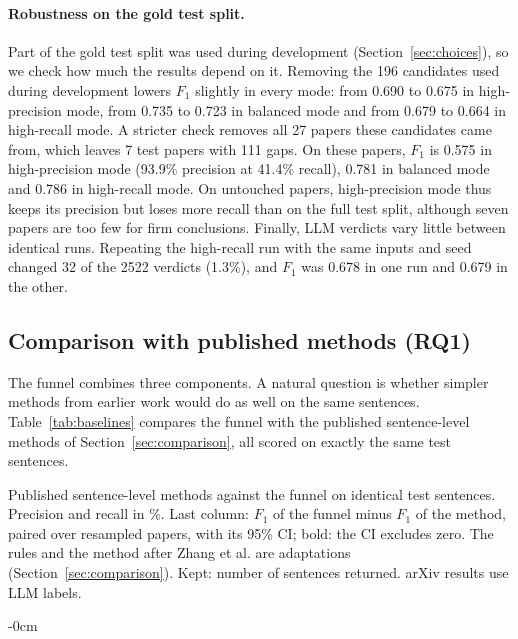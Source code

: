 \paragraph{Robustness on the gold test split.} Part of the gold test split was used during development (Section~\ref{sec:choices}), so we check how much the results depend on it. Removing the 196 candidates used during development lowers $F_1$ slightly in every mode: from 0.690 to 0.675 in high-precision mode, from 0.735 to 0.723 in balanced mode and from 0.679 to 0.664 in high-recall mode. A stricter check removes all 27 papers these candidates came from, which leaves 7 test papers with 111 gaps. On these papers, $F_1$ is 0.575 in high-precision mode (93.9\% precision at 41.4\% recall), 0.781 in balanced mode and 0.786 in high-recall mode. On untouched papers, high-precision mode thus keeps its precision but loses more recall than on the full test split, although seven papers are too few for firm conclusions. Finally, LLM verdicts vary little between identical runs. Repeating the high-recall run with the same inputs and seed changed 32 of the 2522 verdicts (1.3\%), and $F_1$ was 0.678 in one run and 0.679 in the other.

\subsection{Comparison with published methods (RQ1)}
\label{sec:baselines}

The funnel combines three components. A natural question is whether simpler methods from earlier work would do as well on the same sentences. Table~\ref{tab:baselines} compares the funnel with the published sentence-level methods of Section~\ref{sec:comparison}, all scored on exactly the same test sentences.

\begin{table}[htbp]
\caption{Published sentence-level methods against the funnel on identical test sentences. Precision and recall in \%. Last column: $F_1$ of the funnel minus $F_1$ of the method, paired over resampled papers, with its 95\% CI; bold: the CI excludes zero. The rules and the method after Zhang et al. are adaptations (Section~\ref{sec:comparison}). Kept: number of sentences returned. arXiv results use LLM labels.\label{tab:baselines}}
\begin{adjustwidth}{-\extralength}{0cm}
\small

\end{adjustwidth}
\end{table}

